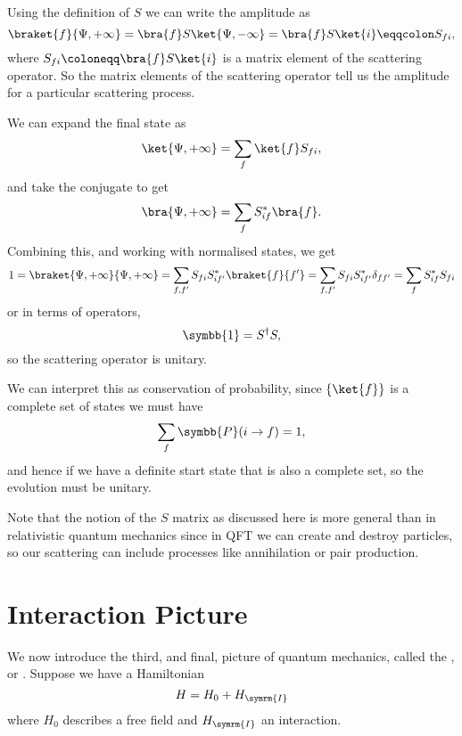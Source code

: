 \documentclass[fleqn]{NotesClass}
\newcommand{\hermit}{{\dagger}}
\newcommand{\ident}{\symbb{1}}
\newcommand{\interaction}{\symrm{I}}
\newcommand{\probability}{\symbb{P}}
\begin{document}
    Using the definition of \(S\) we can write the amplitude as
    \begin{equation}
        \braket{f}{\Psi, +\infty} = \bra{f} S \ket{\Psi, -\infty} = \bra{f} S \ket{i} \eqqcolon S_{fi},
    \end{equation}
    where \(S_{fi} \coloneqq \bra{f}S\ket{i}\) is a matrix element of the scattering operator.
    So the matrix elements of the scattering operator tell us the amplitude for a particular scattering process.
    
    We can expand the final state as
    \begin{equation}
        \ket{\Psi, +\infty} = \sum_f \ket{f} S_{fi},
    \end{equation}
    and take the conjugate to get
    \begin{equation}
        \bra{\Psi, +\infty} = \sum_f S_{if}^*\bra{f}.
    \end{equation}
    Combining this, and working with normalised states, we get
    \begin{equation}
        1 = \braket{\Psi, +\infty}{\Psi, +\infty} = \sum_{f, f'} S_{fi}S_{if'}^{*} \braket{f}{f'} = \sum_{f, f'} S_{fi}S_{if'}^*\delta_{ff'} = \sum_{f} S_{if}^*S_{fi}
    \end{equation}
    or in terms of operators,
    \begin{equation}
        \ident = S^\hermit S,
    \end{equation}
    so the scattering operator is unitary.
    
    We can interpret this as conservation of probability, since \(\{\ket{f}\}\) is a complete set of states we must have 
    \begin{equation}
        \sum_{f} \probability(i \to f) = 1,
    \end{equation}
    and hence if we have a definite start state that is also a complete set, so the evolution must be unitary.
    
    Note that the notion of the \(S\) matrix as discussed here is more general than in relativistic quantum mechanics since in QFT we can create and destroy particles, so our scattering can include processes like annihilation or pair production.
    
    \section{Interaction Picture}
    We now introduce the third, and final, picture of quantum mechanics, called the , or .
    Suppose we have a Hamiltonian
    \begin{equation}
        H = H_0 + H_{\interaction}
    \end{equation}
    where \(H_0\) describes a free field and \(H_{\interaction}\) an interaction.
    
\end{document}
